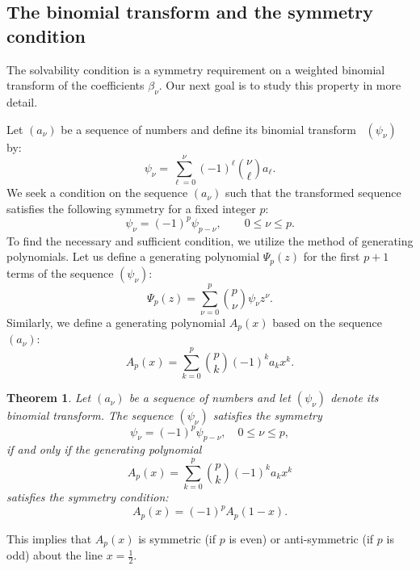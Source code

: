 \documentclass[10pt,reqno,a4paper]{amsart}%
\newtheorem{theorem}{Theorem}
\theoremstyle{definition}
\begin{document}
\subsection{The binomial transform and the symmetry condition}

The solvability condition is a symmetry requirement on a weighted binomial
transform of the coefficients $\beta_{\nu}$. Our next goal is to study this
property in more detail.

Let $(a_{\nu})$ be a sequence of numbers and define its binomial
transform~\cite{Knuth} $(\psi_{\nu})$ by:
\begin{equation}
\psi_{\nu}=\sum_{\ell=0}^{\nu}(-1)^{\ell}\binom{\nu}{\ell}a_{\ell}.
\end{equation}
We seek a condition on the sequence $(a_{\nu})$ such that the transformed
sequence satisfies the following symmetry for a fixed integer $p$:
\begin{equation}
\psi_{\nu}=(-1)^{p}\psi_{p-\nu},\qquad0\leq\nu\leq p.
\end{equation}
To find the necessary and sufficient condition, we utilize the method of
generating polynomials. Let us define a generating polynomial $\Psi_{p}(z)$
for the first $p+1$ terms of the sequence $(\psi_{\nu})$:
\begin{equation}
\Psi_{p}(z)=\sum_{\nu=0}^{p}\binom{p}{\nu}\psi_{\nu}z^{\nu}.
\end{equation}
Similarly, we define a generating polynomial $A_{p}(x)$ based on the sequence
$(a_{\nu})$:
\begin{equation}
A_{p}(x)=\sum_{k=0}^{p}\binom{p}{k}(-1)^{k}a_{k}x^{k}. \label{def:genpoly}%
\end{equation}


\begin{theorem}
\label{the:symmPoly} Let $(a_{\nu})$ be a sequence of numbers and let
$(\psi_{\nu})$ denote its binomial transform. The sequence $(\psi_{\nu})$
satisfies the symmetry
\[
\psi_{\nu}= (-1)^{p} \psi_{p-\nu},\quad0 \le\nu\le p,
\]
if and only if the generating polynomial
\[
A_{p}(x) = \sum_{k=0}^{p} \binom{p}{k} (-1)^{k} a_{k} x^{k}%
\]
satisfies the symmetry condition:
\[
A_{p}(x) = (-1)^{p} A_{p}(1-x).
\]

\end{theorem}

This implies that $A_{p}(x)$ is symmetric (if $p$ is even) or anti-symmetric
(if $p$ is odd) about the line $x=\frac{1}{2}$.
\end{document}
